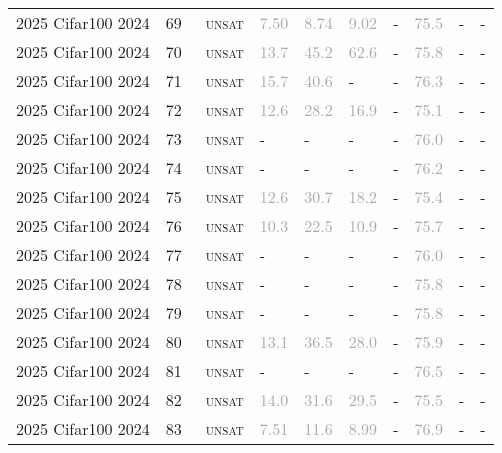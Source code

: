 \begin{center}
{\begin{longtable}{@{}llllllllll@{}}
2025 Cifar100 2024 & 69 & ~\textsc{unsat} & \textcolor{darkgray}{7.50} & \textcolor{darkgray}{8.74} & \textcolor{darkgray}{9.02} & - & \textcolor{darkgray}{75.5} & - & - \\
2025 Cifar100 2024 & 70 & ~\textsc{unsat} & \textcolor{darkgray}{13.7} & \textcolor{darkgray}{45.2} & \textcolor{darkgray}{62.6} & - & \textcolor{darkgray}{75.8} & - & - \\
2025 Cifar100 2024 & 71 & ~\textsc{unsat} & \textcolor{darkgray}{15.7} & \textcolor{darkgray}{40.6} & - & - & \textcolor{darkgray}{76.3} & - & - \\
2025 Cifar100 2024 & 72 & ~\textsc{unsat} & \textcolor{darkgray}{12.6} & \textcolor{darkgray}{28.2} & \textcolor{darkgray}{16.9} & - & \textcolor{darkgray}{75.1} & - & - \\
2025 Cifar100 2024 & 73 & ~\textsc{unsat} & - & - & - & - & \textcolor{darkgray}{76.0} & - & - \\
2025 Cifar100 2024 & 74 & ~\textsc{unsat} & - & - & - & - & \textcolor{darkgray}{76.2} & - & - \\
2025 Cifar100 2024 & 75 & ~\textsc{unsat} & \textcolor{darkgray}{12.6} & \textcolor{darkgray}{30.7} & \textcolor{darkgray}{18.2} & - & \textcolor{darkgray}{75.4} & - & - \\
2025 Cifar100 2024 & 76 & ~\textsc{unsat} & \textcolor{darkgray}{10.3} & \textcolor{darkgray}{22.5} & \textcolor{darkgray}{10.9} & - & \textcolor{darkgray}{75.7} & - & - \\
2025 Cifar100 2024 & 77 & ~\textsc{unsat} & - & - & - & - & \textcolor{darkgray}{76.0} & - & - \\
2025 Cifar100 2024 & 78 & ~\textsc{unsat} & - & - & - & - & \textcolor{darkgray}{75.8} & - & - \\
2025 Cifar100 2024 & 79 & ~\textsc{unsat} & - & - & - & - & \textcolor{darkgray}{75.8} & - & - \\
2025 Cifar100 2024 & 80 & ~\textsc{unsat} & \textcolor{darkgray}{13.1} & \textcolor{darkgray}{36.5} & \textcolor{darkgray}{28.0} & - & \textcolor{darkgray}{75.9} & - & - \\
2025 Cifar100 2024 & 81 & ~\textsc{unsat} & - & - & - & - & \textcolor{darkgray}{76.5} & - & - \\
2025 Cifar100 2024 & 82 & ~\textsc{unsat} & \textcolor{darkgray}{14.0} & \textcolor{darkgray}{31.6} & \textcolor{darkgray}{29.5} & - & \textcolor{darkgray}{75.5} & - & - \\
2025 Cifar100 2024 & 83 & ~\textsc{unsat} & \textcolor{darkgray}{7.51} & \textcolor{darkgray}{11.6} & \textcolor{darkgray}{8.99} & - & \textcolor{darkgray}{76.9} & - & - \\

\end{longtable}}
\end{center}
